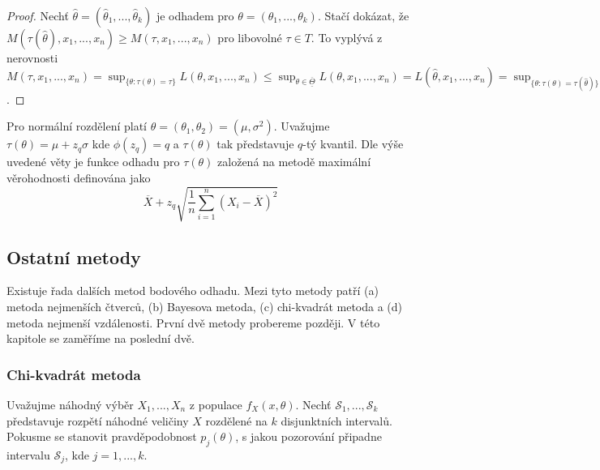 \begin{proof}
Nechť $\hat{\theta} = (\hat{\theta}_1, ..., \hat{\theta}_k)$ je odhadem pro $\theta = (\theta_1, ..., \theta_k)$. Stačí dokázat, že $M(\tau(\hat{\theta}), x_1, ..., x_n) \ge M(\tau, x_1, ..., x_n)$ pro libovolné $\tau \in T$. To vyplývá z nerovnosti $M(\tau, x_1, ..., x_n) = \sup_{\{\theta: \tau(\theta) = \tau \}}L(\theta, x_1, ..., x_n) \le \sup_{\theta \in \overline{\underline{\Theta}}} L(\theta, x_1, ..., x_n) = L(\hat{\theta}, x_1, ..., x_n) = \sup_{\{\theta: \tau(\theta) = \tau(\hat{\theta})\}}L(\theta, x_1, ..., x_n) = M(\tau(\hat{\theta}), x_1, ..., x_n)$.
\end{proof}

\begin{example}
Pro normální rozdělení platí $\theta = (\theta_1, \theta_2) = (\mu, \sigma^2)$. Uvažujme $\tau(\theta) = \mu + z_q\sigma$ kde $\phi(z_q) = q$ a $\tau(\theta)$ tak představuje $q$-tý kvantil. Dle výše uvedené věty je funkce odhadu pro $\tau(\theta)$ založená na metodě maximální věrohodnosti definována jako
\begin{equation*}
\overline{X} + z_q \sqrt{\frac{1}{n} \sum_{i = 1}^n (X_i - \overline{X})^2}
\end{equation*}
\end{example}

\subsection{Ostatní metody}

Existuje řada dalších metod bodového odhadu. Mezi tyto metody patří (a) metoda nejmenších čtverců, (b) Bayesova metoda, (c) chi-kvadrát metoda a (d) metoda nejmenší vzdálenosti. První dvě metody probereme později. V této kapitole se zaměříme na poslední dvě.

\subsubsection{Chi-kvadrát metoda}

Uvažujme náhodný výběr $X_1, ..., X_n$ z populace $f_X(x, \theta)$. Nechť $\mathscr{S}_1, ..., \mathscr{S}_k$ představuje rozpětí náhodné veličiny $X$ rozdělené na $k$ disjunktních intervalů. Pokusme se stanovit pravděpodobnost $p_j(\theta)$, s jakou pozorování připadne intervalu $\mathscr{S}_j$, kde $j = 1, ..., k$.

